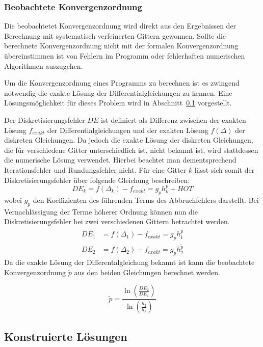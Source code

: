 \subsubsection{Beobachtete Konvergenzordnung}

Die beobachtetet Konvergenzordnung wird direkt aus den Ergebnissen der Berechnung mit systematisch
verfeinerten Gittern gewonnen. Sollte die berechnete Konvergenzordnung nicht mit der formalen
Konvergenzordnung übereinstimmen ist von Fehlern im Programm oder fehlerhaften numerischen Algorithmen auszugehen.

Um die Konvergenzordnung eines Programms zu berechnen ist es zwingend notwendig die exakte Lösung der
Differentialgleichungen zu kennen. Eine Lösungsmöglichkeit für dieses Problem wird in Abschnitt~\ref{sec:man_sol}
vorgestellt.

Der Diskretisierungsfehler $DE$ ist definiert als Differenz zwischen der exakten Lösung $f_{exakt}$
der Differentialgleichungen und der exakten Lösung $f(\Delta)$ der diskreten Gleichungen.
Da jedoch die exakte Lösung der diskreten Gleichungen, die für verschiedene Gitter unterschiedlich ist,
nicht bekannt ist, wird stattdessen die numerische Lösung verwendet. Hierbei beachtet man dementsprechend
Iterationsfehler und Rundungsfehler nicht. Für eine Gitter $k$ lässt sich somit der Diskretisierungsfehler
über folgende Gleichung beschreiben:
\begin{equation*}
  DE_k=f(\Delta_k) - f_{exakt} = g_p h_k^p + HOT
\end{equation*}
wobei $g_p$ den Koeffizienten des führenden Terms des Abbruchfehlers darstellt.
Bei Vernachlässigung der Terme höherer Ordnung können nun die Diskretisierungsfehler bei
zwei verschiedenen Gittern betrachtet werden.
\begin{align*}
  DE_1 &= f(\Delta_1) - f_{exakt} = g_p h_1^{\tilde{p}}\\
  DE_2 &= f(\Delta_2) - f_{exakt} = g_p h_2^{\tilde{p}}
\end{align*}
Da die exakte Lösung der Differentalgleichung bekannt ist kann die beobachtete Konvergenzordnung
$\tilde{p}$ aus den beiden Gleichungen berechnet werden.

\begin{equation}
  \tilde{p}=\frac{\ln \left(\frac{DE_2}{DE_1}\right)}{\ln \left(\frac{h_2}{h_1}\right)}
\end{equation}


\subsection{Konstruierte Lösungen}
\label{sec:man_sol}

